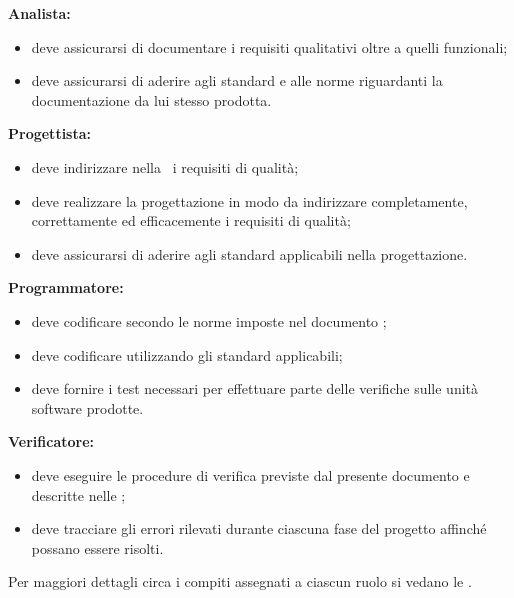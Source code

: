 \documentclass[../PianoDiQualifica.tex]{subfiles}
\begin{document}
			\textbf{Analista:}
			\begin{itemize}
				\item deve assicurarsi di documentare i requisiti qualitativi oltre a quelli funzionali;
				\item deve assicurarsi di aderire agli standard e alle norme riguardanti la documentazione da lui stesso prodotta.
			\end{itemize}
			\textbf{Progettista:}
			\begin{itemize}
				\item deve indirizzare nella \specificatecnica\ i requisiti di qualità;
				\item deve realizzare la progettazione in modo da indirizzare completamente, correttamente ed efficacemente i requisiti di qualità;
				\item deve assicurarsi di aderire agli standard applicabili nella progettazione.
			\end{itemize}
			\textbf{Programmatore:}
			\begin{itemize}
				\item deve codificare secondo le norme imposte nel documento \normediprogettov;
				\item deve codificare utilizzando gli standard applicabili;
				\item deve fornire i test necessari per effettuare parte delle verifiche sulle unità software prodotte.
			\end{itemize}
			\textbf{Verificatore:}
			\begin{itemize}
				\item deve eseguire le procedure di verifica previste dal presente documento e descritte nelle \normediprogettov;
				\item deve tracciare gli errori rilevati durante ciascuna fase del progetto affinché possano essere risolti.
			\end{itemize}
		Per maggiori dettagli circa i compiti assegnati a ciascun ruolo si vedano le \normediprogettov.
\end{document}
